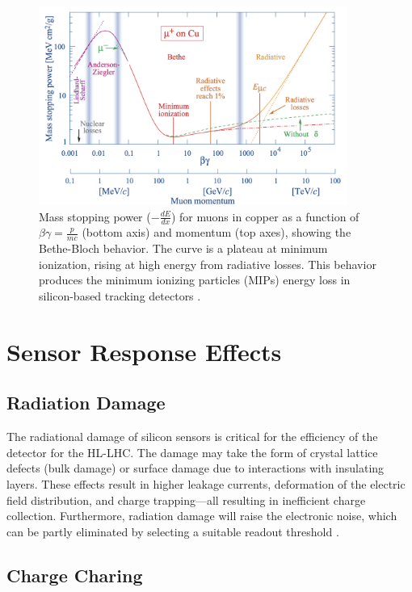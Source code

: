 \begin{figure}[H]
    \centering
    \includegraphics[width=0.9\textwidth]{images/Bloch.png}
    \caption{Mass stopping power ($-\frac{dE}{dx}$) for muons in copper as a function of $\beta\gamma = \frac{p}{mc}$ (bottom axis) and momentum (top axes), showing the Bethe-Bloch behavior. The curve is a plateau at minimum ionization, rising at high energy from radiative losses. This behavior produces the minimum ionizing particles (MIPs) energy loss in silicon-based tracking detectors \cite{Bichsel200827PO}.}
    \label{fig:Bloch}
\end{figure}

\section{Sensor Response Effects}
\subsection{Radiation Damage}

The radiational damage of silicon sensors is critical for the efficiency of the detector for the HL-LHC. The damage may take the form of crystal lattice defects (bulk damage) or surface damage due to interactions with insulating layers. These effects result in higher leakage currents, deformation of the electric field distribution, and charge trapping—all resulting in inefficient charge collection. Furthermore, radiation damage will raise the electronic noise, which can be partly eliminated by selecting a suitable readout threshold \cite{Eber_2014}.

\subsection{Charge Charing}

